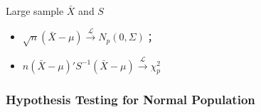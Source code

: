     

\begin{point}
    Large sample $ \bar{X} $ and $ S $
\end{point}
\begin{itemize}[topsep=2pt,itemsep=2pt]
    \item $ \sqrt{n}(\bar{X}-\mu)\xrightarrow[]{\mathscr{L}} N_p(0,\Sigma ) $；
    \item $ n(\bar{X}-\mu)'S ^{-1}(\bar{X}-\mu)\xrightarrow[]{\mathscr{L}} \chi_p^2 $
\end{itemize}

    




\subsubsection{Hypothesis Testing for Normal Population}\label{SubSectionMultivariateHypothesisTesting}
